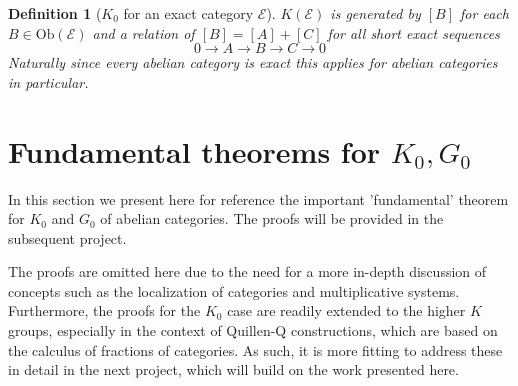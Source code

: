 \documentclass[12pt]{report}
\numberwithin{equation}{section}
\newtheorem{definition}[dummy]{Definition}
\begin{document}
	\begin{definition}[$K_0$ for an exact category $\mathcal{E}$]
		$K(\mathcal E)$ is generated by $[B]$ for each $B \in \mathrm{Ob}(\mathcal{E})$ and a relation of $[B]=[A]+[C]$ for all short exact sequences \[ 0 \to A \to B \to C \to 0 \]
		Naturally since every abelian category is exact this applies for abelian categories in particular.
	\end{definition}
	
	\section{Fundamental theorems for $K_0,G_0$}
	In this section we present here for reference the important 'fundamental' theorem for $K_0$ and $G_0$ of abelian categories. The proofs will be provided in the subsequent project. 
	
	The proofs are omitted here due to the need for a more in-depth discussion of concepts such as the localization of categories and multiplicative systems. Furthermore, the proofs for the $K_0$ case are readily extended to the higher $K$ groups, especially in the context of Quillen-Q constructions, which are based on the calculus of fractions of categories. As such, it is more fitting to address these in detail in the next project, which will build on the work presented here.
	
\end{document}
